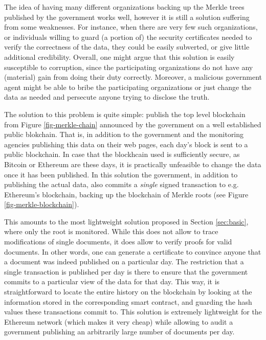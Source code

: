 
The idea of having many different organizations backing up the Merkle trees published by the government works well, however it is still a solution suffering from some weaknesses. For instance, when there are very few such organizations, or individuals willing to guard (a portion of) the security certificates needed to verify the correctness of the data, they could be easily subverted, or give little additional credibility. Overall, one might argue that this solution is easily susceptible to corruption, since the participating organizations do not have any (material) gain from doing their duty correctly. Moreover, a malicious government agent might be able to bribe the participating organizations or just change the data as needed and persecute anyone trying to disclose the truth.

The solution to this problem is quite simple: publish the top level blockchain from Figure \ref{fig-merkle-chain} announced by the government on a well established public blokchain. That is, in addition to the government and the monitoring agencies publishing this data on their web pages, each day's block is sent to a public blockchain. In case that the blockhcain used is sufficiently secure, as Bitcoin or Ethereum are these days, it is practically unfeasible to change the data once it has been published. In this solution the government, in addition to publishing the actual data, also commits a {\em single} signed transaction to e.g. Ethereum's blockchain, backing up the blockchain of Merkle roots (see Figure \ref{fig-merkle-blockchain}).

This amounts to the most lightweight solution proposed in Section \ref{sec:basic}, where only the root is monitored. While this does not allow to trace modifications of single documents, it does allow to verify proofs for valid documents. In other words, one can generate a certificate to convince anyone that a document was indeed published on a particular day. The restriction that a single transaction is published per day is there to ensure that the government commits to a particular view of the data for that day. This way, it is straightforward to locate the entire history on the blockchain by looking at the information stored in the corresponding smart contract, and guarding the hash values these transactions commit to. This solution is extremely lightweight for the Ethereum network (which makes it very cheap) while allowing to audit a government publishing an arbitrarily large number of documents per day.

